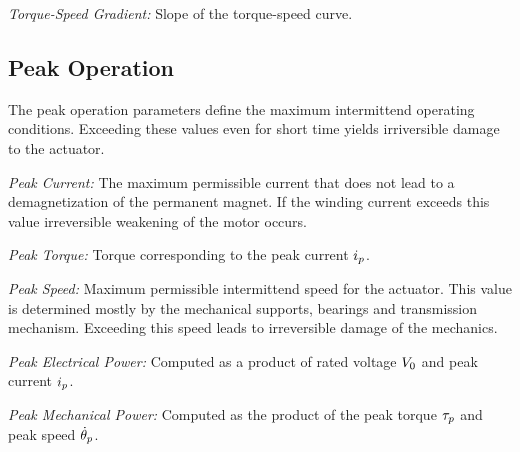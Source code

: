 \documentclass[a4paper,10pt]{cjtdsheet}      %
\begin{document}
\begin{multicols}{2}
\emph{Torque-Speed Gradient:} Slope of the torque-speed curve.

%
%
\subsection*{\textcolor{cjtred}{Peak Operation}}
The peak operation parameters define the maximum intermittend operating conditions. Exceeding these values even for short time yields irriversible damage to the actuator.

\emph{Peak Current:} The maximum permissible current that does not lead to a demagnetization of the permanent magnet. If the winding current exceeds this value irreversible weakening of the motor occurs.

\emph{Peak Torque:} Torque corresponding to the peak current $i_p$.

\emph{Peak Speed:} Maximum permissible intermittend speed for the actuator. This value is determined mostly by the mechanical supports, bearings and transmission mechanism. Exceeding this speed leads to irreversible damage of the mechanics.

\emph{Peak Electrical Power:} Computed as a product of rated voltage $V_0$ and peak current $i_p$.

\emph{Peak Mechanical Power:} Computed as the product of the peak torque $\tau_p$ and peak speed $\dot{\theta}_p$.

\end{multicols}
\end{document}
